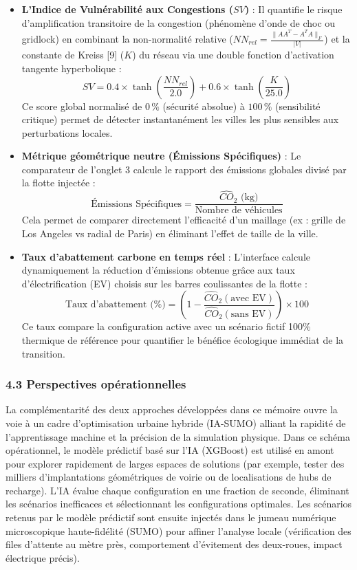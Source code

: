 \documentclass[10pt, a4paper]{article}
\begin{document}
\begin{itemize}
\item
  \textbf{L'Indice de Vulnérabilité aux Congestions (\(SV\))} : Il
  quantifie le risque d'amplification transitoire de la congestion
  (phénomène d'onde de choc ou gridlock) en combinant la non-normalité
  relative (\(NN_{rel} = \frac{\|AA^T - A^TA\|_F}{|V|}\)) et la
  constante de Kreiss {[}9{]} (\(K\)) du réseau via une double fonction
  d'activation tangente hyperbolique :
  \[SV = 0.4 \times \tanh\left(\frac{NN_{rel}}{2.0}\right) + 0.6 \times \tanh\left(\frac{K}{25.0}\right)\]
  Ce score global normalisé de \(0\,\%\) (sécurité absolue) à
  \(100\,\%\) (sensibilité critique) permet de détecter instantanément
  les villes les plus sensibles aux perturbations locales.
\item
  \textbf{Métrique géométrique neutre (Émissions Spécifiques)} : Le
  comparateur de l'onglet 3 calcule le rapport des émissions globales
  divisé par la flotte injectée :
  \[\text{Émissions Spécifiques} = \frac{\widehat{CO}_2 \text{ (kg)}}{\text{Nombre de véhicules}}\]
  Cela permet de comparer directement l'efficacité d'un maillage (ex :
  grille de Los Angeles vs radial de Paris) en éliminant l'effet de
  taille de la ville.
\item
  \textbf{Taux d'abattement carbone en temps réel} : L'interface calcule
  dynamiquement la réduction d'émissions obtenue grâce aux taux
  d'électrification (EV) choisis sur les barres coulissantes de la
  flotte :
  \[\text{Taux d'abattement (\%)} = \left( 1 - \frac{\widehat{CO}_2(\text{avec EV})}{\widehat{CO}_2(\text{sans EV})} \right) \times 100\]
  Ce taux compare la configuration active avec un scénario fictif 100\%
  thermique de référence pour quantifier le bénéfice écologique immédiat
  de la transition.
\end{itemize}

\subsubsection{4.3 Perspectives
opérationnelles}\label{perspectives-opuxe9rationnelles}

La complémentarité des deux approches développées dans ce mémoire ouvre
la voie à un cadre d'optimisation urbaine hybride (IA-SUMO) alliant la
rapidité de l'apprentissage machine et la précision de la simulation
physique. Dans ce schéma opérationnel, le modèle prédictif basé sur l'IA
(XGBoost) est utilisé en amont pour explorer rapidement de larges
espaces de solutions (par exemple, tester des milliers d'implantations
géométriques de voirie ou de localisations de hubs de recharge). L'IA
évalue chaque configuration en une fraction de seconde, éliminant les
scénarios inefficaces et sélectionnant les configurations optimales. Les
scénarios retenus par le modèle prédictif sont ensuite injectés dans le
jumeau numérique microscopique haute-fidélité (SUMO) pour affiner
l'analyse locale (vérification des files d'attente au mètre près,
comportement d'évitement des deux-roues, impact électrique précis).
\end{document}

